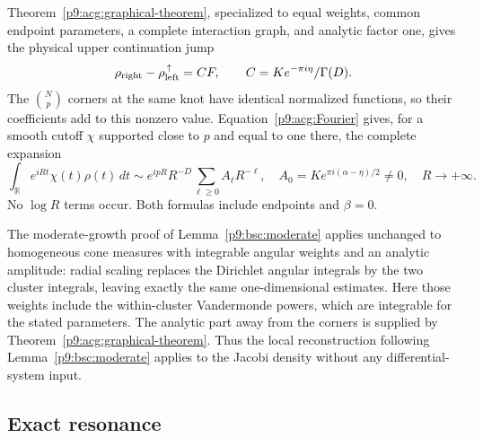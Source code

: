 \documentclass[11pt,a4paper]{article}
\theoremstyle{definition}
\theoremstyle{remark}
\numberwithin{equation}{section}
\begin{document}
Theorem~\ref{p9:acg:graphical-theorem}, specialized to equal weights,
common endpoint parameters, a complete interaction graph, and analytic
factor one, gives the physical upper continuation jump
\begin{equation}\label{p9:eq:JR:connection}
 \rho_{\rm right}-\rho_{\rm left}^{\,\uparrow}
 =CF,\qquad C=K e^{-\pi i\eta}/\Gamma(D).
\end{equation}
The \(\binom Np\) corners at the same knot have identical normalized
functions, so their coefficients add to this nonzero value.
Equation~\eqref{p9:acg:Fourier} gives, for a smooth cutoff \(\chi\)
supported close to \(p\) and equal to one there, the complete expansion
\begin{equation}\label{p9:eq:JR:fourier}
 \int_{\mathbb R}e^{iRt}\chi(t)\rho(t)\,dt
 \sim e^{ipR}R^{-D}\sum_{\ell\ge0}A_\ell R^{-\ell},
 \quad A_0=K e^{\pi i(\alpha-\eta)/2}\ne0 ,
 \quad R\longrightarrow+\infty .
\end{equation}
No \(\log R\) terms occur. Both formulas include endpoints and
\(\beta=0\).

The moderate-growth proof of Lemma~\ref{p9:bsc:moderate} applies unchanged
to homogeneous cone measures with integrable angular weights and an
analytic amplitude: radial scaling replaces the Dirichlet angular
integrals by the two cluster integrals, leaving exactly the same
one-dimensional estimates. Here those weights include the
within-cluster Vandermonde powers, which are integrable for the stated
parameters. The analytic part away from the corners is supplied by
Theorem~\ref{p9:acg:graphical-theorem}. Thus the local reconstruction
following Lemma~\ref{p9:bsc:moderate} applies to the Jacobi density without
any differential-system input.

\subsection{Exact resonance}
\end{document}
